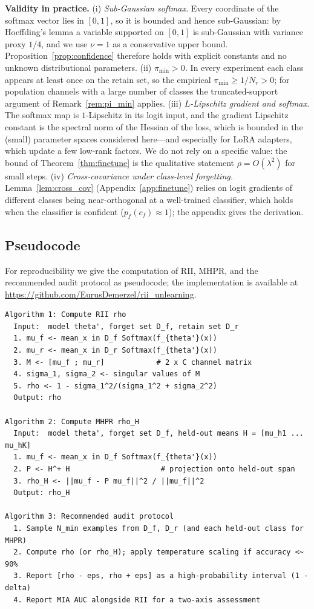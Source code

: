 \documentclass[smallextended]{svjour3}       %
\begin{document}
\textbf{Validity in practice.} (i) \emph{Sub-Gaussian softmax.} Every coordinate of the softmax vector lies in $[0,1]$, so it is bounded and hence sub-Gaussian: by Hoeffding's lemma a variable supported on $[0,1]$ is sub-Gaussian with variance proxy $1/4$, and we use $\nu=1$ as a conservative upper bound. Proposition~\ref{prop:confidence} therefore holds with explicit constants and no unknown distributional parameters. (ii) \emph{$\pi_{\min}>0$.} In every experiment each class appears at least once on the retain set, so the empirical $\pi_{\min}\ge 1/N_r>0$; for population channels with a large number of classes the truncated-support argument of Remark~\ref{rem:pi_min} applies. (iii) \emph{$L$-Lipschitz gradient and softmax.} The softmax map is $1$-Lipschitz in its logit input, and the gradient Lipschitz constant is the spectral norm of the Hessian of the loss, which is bounded in the (small) parameter spaces considered here---and especially for LoRA adapters, which update a few low-rank factors. We do not rely on a specific value: the bound of Theorem~\ref{thm:finetune} is the qualitative statement $\rho=O(\lambda^2)$ for small steps. (iv) \emph{Cross-covariance under class-level forgetting.} Lemma~\ref{lem:cross_cov} (Appendix~\ref{app:finetune}) relies on logit gradients of different classes being near-orthogonal at a well-trained classifier, which holds when the classifier is confident ($p_f(c_f)\approx1$); the appendix gives the derivation.

\subsection{Pseudocode}
\label{sec:pseudocode}

For reproducibility we give the computation of RII, MHPR, and the recommended audit protocol as pseudocode; the implementation is available at \url{https://github.com/EurusDemerzel/rii_unlearning}.

{\small\begin{verbatim}
Algorithm 1: Compute RII rho
  Input:  model theta', forget set D_f, retain set D_r
  1. mu_f <- mean_x in D_f Softmax(f_{theta'}(x))
  2. mu_r <- mean_x in D_r Softmax(f_{theta'}(x))
  3. M <- [mu_f ; mu_r]            # 2 x C channel matrix
  4. sigma_1, sigma_2 <- singular values of M
  5. rho <- 1 - sigma_1^2/(sigma_1^2 + sigma_2^2)
  Output: rho

Algorithm 2: Compute MHPR rho_H
  Input:  model theta', forget set D_f, held-out means H = [mu_h1 ... mu_hK]
  1. mu_f <- mean_x in D_f Softmax(f_{theta'}(x))
  2. P <- H^+ H                     # projection onto held-out span
  3. rho_H <- ||mu_f - P mu_f||^2 / ||mu_f||^2
  Output: rho_H

Algorithm 3: Recommended audit protocol
  1. Sample N_min examples from D_f, D_r (and each held-out class for MHPR)
  2. Compute rho (or rho_H); apply temperature scaling if accuracy <~ 90%
  3. Report [rho - eps, rho + eps] as a high-probability interval (1 - delta)
  4. Report MIA AUC alongside RII for a two-axis assessment
\end{verbatim}}
\end{document}
